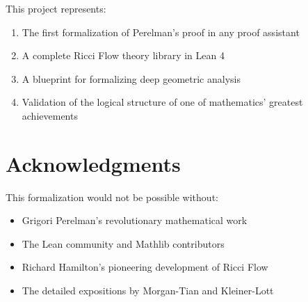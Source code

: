 This project represents:
\begin{enumerate}
\item The first formalization of Perelman's proof in any proof assistant
\item A complete Ricci Flow theory library in Lean 4
\item A blueprint for formalizing deep geometric analysis
\item Validation of the logical structure of one of mathematics' greatest achievements
\end{enumerate}

\section{Acknowledgments}

This formalization would not be possible without:
\begin{itemize}
\item Grigori Perelman's revolutionary mathematical work
\item The Lean community and Mathlib contributors
\item Richard Hamilton's pioneering development of Ricci Flow
\item The detailed expositions by Morgan-Tian and Kleiner-Lott
\end{itemize}





